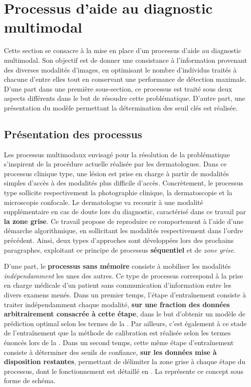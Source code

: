 \section{Processus d'aide au diagnostic multimodal}
Cette section se consacre à la mise en place d'un processus d'aide au diagnostic multimodal. Son objectif est de donner une consistance à l'information provenant des diverses modalités d'images, en optimisant le nombre d'individus traités à chacune d'entre elles tout en conservant une performance de détection maximale. D'une part dans une première sous-section, ce processus est traité sous deux aspects différents dans le but de résoudre cette problématique. D'autre part, une présentation du modèle permettant la détermination des seuil clés est réalisée.

\subsection{Présentation des processus}
Les processus multimodaux envisagé pour la résolution de la problématique s'inspirent de la procédure actuelle réalisée par les dermatologues. Dans ce processus clinique type, une lésion est prise en charge à partir de modalités simples d'accès à des modalités plus difficile d'accès. Concrètement, le processus type sollicite respectivement la photographie clinique, la dermatoscopie et la microscopie confocale. Le dermatologue va recourir à une modalité supplémentaire en cas de doute lors du diagnostic, caractérisé dans ce travail par \textbf{la zone grise}. Ce travail propose de reproduire ce comportement à l'aide d'une démarche algorithmique, en sollicitant les modalités respectivement dans l'ordre précédent. Ainsi, deux types d'approches sont développées lors des prochains paragraphes, exploitant ce principe de processus \textbf{séquentiel} et de \textit{zone grise}.\par

D'une part, le \textbf{processus sans mémoire} consiste à mobiliser les modalités \textit{indépendamment} les unes des autres. Ce type de processus correspond à la prise en charge médicale d'un patient sans communication d'information entre les divers examens menés. Dans un premier temps, l'étape d'entraînement consiste à traiter indépendamment chaque modalité, \textbf{sur une fraction des données arbitrairement consacrée à cette étape}, dans le but d'obtenir un modèle de prédiction optimal selon les termes de la . Par ailleurs, c'est également à ce stade de l'entraînement que la méthode de calibration est réalisée selon les termes énoncés lors de la . Dans un second temps, cette même étape d'entraînement consiste à déterminer des seuils de confiance, \textbf{sur les données mise à disposition restantes}, permettant de délimiter la zone grise à chaque étape du processus, dont le fonctionnement est détaillé en . La  représente ce concept sous forme de schéma.\par


